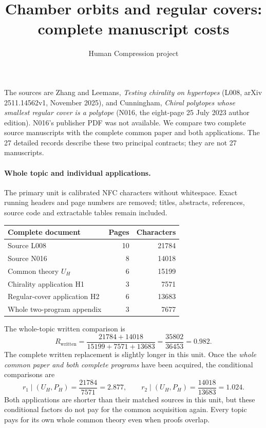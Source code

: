 \documentclass[11pt,a4paper]{article}
\title{Chamber orbits and regular covers:\\complete manuscript costs}
\author{Human Compression project}\date{}
\begin{document}
\maketitle
The sources are Zhang and Leemans, \emph{Testing chirality on hypertopes}
(L008, arXiv 2511.14562v1, November 2025), and Cunningham,
\emph{Chiral polytopes whose smallest regular cover is a polytope} (N016, the eight-page
25 July 2023 author edition). N016's publisher PDF was not available.
We compare two complete source manuscripts with the complete common
paper and both applications. The 27 detailed records describe these two
principal contracts; they are not 27 manuscripts.

\paragraph{Whole topic and individual applications.}
The primary unit is calibrated NFC characters without whitespace. Exact
running headers and page numbers are removed; titles, abstracts, references,
source code and extractable tables remain included.
\begin{center}\begin{tabular}{lrr}\toprule
Complete document & Pages & Characters\\\midrule
Source L008 & 10 & 21784\\
Source N016 & 8 & 14018\\
Common theory $U_H$ & 6 & 15199\\
Chirality application H1 & 3 & 7571\\
Regular-cover application H2 & 6 & 13683\\
Whole two-program appendix & 3 & 7677\\\bottomrule
\end{tabular}\end{center}
The whole-topic written comparison is
\[
 R_{\mathrm{written}}=\frac{21784+14018}{15199+7571+13683}
 =\frac{35802}{36453}=0.982.
\]
The complete written replacement is slightly longer in this unit. Once the
\emph{whole common paper and both complete programs} have been acquired,
the conditional comparisons are
\[
 r_1\mid(U_H,P_H)=\frac{21784}{7571}=2.877,\qquad
 r_2\mid(U_H,P_H)=\frac{14018}{13683}=1.024.
\]
Both applications are shorter than their matched sources in this unit, but
these conditional factors do not pay for the common acquisition again.
Every topic pays for its own whole common theory even when proofs overlap.
\end{document}
